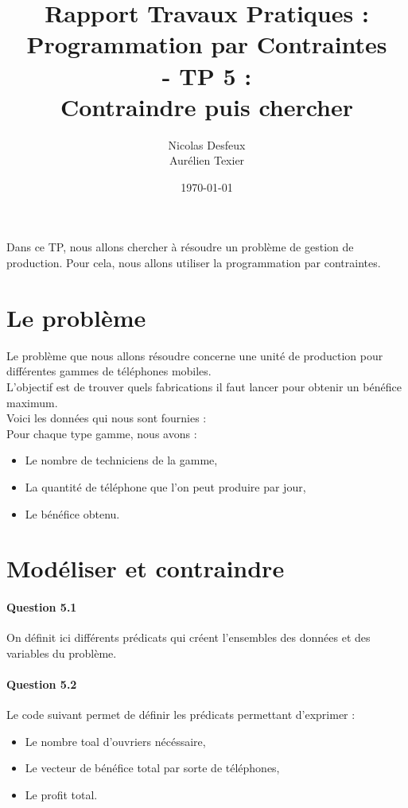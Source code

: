 \documentclass[11pt]{article} %
\date{\today}
\title{Rapport Travaux Pratiques : \\Programmation par Contraintes\\ - TP 5 : \\\textbf{Contraindre puis chercher}}
\author{Nicolas Desfeux\\Aurélien Texier}
\begin{document}
\lstset{language=Prolog,breaklines=true,numbers=left,basicstyle=\footnotesize ,numberstyle=\footnotesize}
\maketitle
\paragraph{} Dans ce TP, nous allons chercher à résoudre un problème de gestion de production. Pour cela, nous allons utiliser la programmation par contraintes.

\section{Le problème}
Le problème que nous allons résoudre concerne une unité de production pour différentes gammes de téléphones mobiles.\\
L'objectif est de trouver quels fabrications il faut lancer pour obtenir un bénéfice maximum.\\
Voici les données qui nous sont fournies : \\
Pour chaque type gamme, nous avons : 
\begin{itemize}
\item Le nombre de techniciens de la gamme,
\item La quantité de téléphone que l'on peut produire par jour,
\item Le bénéfice obtenu.
\end{itemize}

\section{Modéliser et contraindre}
\paragraph{Question 5.1}
On définit ici différents prédicats qui créent l'ensembles des données et des variables du problème.

\paragraph{Question 5.2}
Le code suivant permet de définir les prédicats permettant d'exprimer : 
\begin{itemize}
\item Le nombre toal d'ouvriers nécéssaire,
\item Le vecteur de bénéfice total par sorte de téléphones,
\item Le profit total.
\end{itemize}

\end{document}
